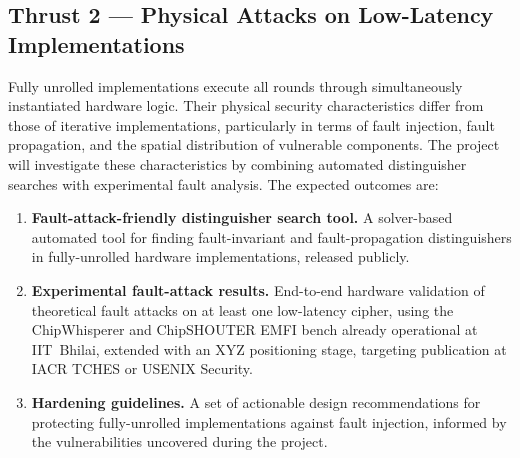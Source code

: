 \subsection*{Thrust 2 — Physical Attacks on Low-Latency Implementations}
Fully unrolled implementations execute all rounds through simultaneously instantiated hardware logic.
Their physical security characteristics differ from those of iterative implementations, particularly in terms of fault injection, fault propagation, and the spatial distribution of vulnerable components.
The project will investigate these characteristics by combining automated distinguisher searches with experimental fault analysis. The expected outcomes are:

\begin{enumerate}[label=\textbf{D\arabic*.}, leftmargin=*, itemsep=2pt, start=4]
  \item \textbf{Fault-attack-friendly distinguisher search tool.}
        A solver-based automated tool for finding fault-invariant and fault-propagation distinguishers in fully-unrolled hardware implementations, released publicly.

  \item \textbf{Experimental fault-attack results.}
        End-to-end hardware validation of theoretical fault attacks on at least one low-latency cipher, using the ChipWhisperer and ChipSHOUTER EMFI bench already operational at IIT~Bhilai, extended with an XYZ positioning stage, targeting publication at IACR TCHES or USENIX Security.

  \item \textbf{Hardening guidelines.}
        A set of actionable design recommendations for protecting fully-unrolled implementations against fault injection, informed by the vulnerabilities uncovered during the project.
\end{enumerate}


